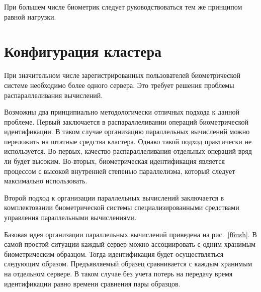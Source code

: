 \begin{multicols}{2}
     При большем числе биометрик следует руководствоваться тем же принципом 
равной нагрузки.
     
     \section{ Конфигурация кластера}

 \vspace*{-6pt}    

     При значительном чис\-ле зарегистрированных пользователей био\-мет\-ри\-че\-ской
     сис\-те\-ме необхо\-ди\-мо более одного сервера.
     Это требует решения проблемы распараллеливания вы\-чис\-ле\-ний.

     
     Возможны два принципиально методологически отличных подхода к данной 
проблеме. Первый заключается в распараллеливании операций био\-мет\-ри\-че\-ской 
идентификации. В таком случае организацию параллельных вычислений можно 
переложить на штатные средства кластера. Однако такой подход практически не 
используется. Во-первых, качество распараллеливания отдельных операций вряд ли 
будет высоким. Во-вторых, биометрическая идентификация является процессом с 
высокой внутренней степенью параллелизма, который следует максимально 
использовать. 
     
     Второй подход к организации параллельных вычислений заключается в 
комплектовании био\-мет\-ри\-че\-ской системы специализированными средствами 
управления параллельными вы\-чис\-ле\-ниями. 
   {
   
   }
   
     Базовая идея организации параллельных вы\-чис\-ле\-ний приведена на 
рис.~\ref{f6ush}. В самой простой ситуации каждый сервер можно ассоциировать с 
одним хранимым биометрическим образцом.  Тогда идентификация будет 
осуществляться следующим образом. Предъявляемый образец сравнивается с каждым 
хранимым на отдельном сервере. В таком случае без учета потерь на передачу время 
идентификации равно времени сравнения пары образцов.%

\end{multicols}

%


